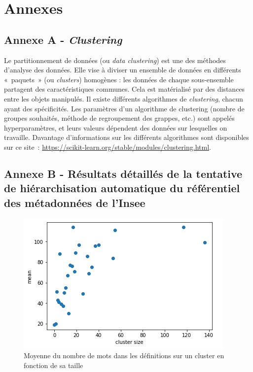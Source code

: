 \section*{Annexes}

\subsection*{Annexe A - \textit{Clustering}}
Le partitionnement de données (ou \textit{data clustering}) est une des méthodes d'analyse des données. Elle vise à diviser un ensemble de données en différents «~paquets~» (ou \textit{clusters}) homogènes : les données de chaque sous-ensemble partagent des caractéristiques communes. Cela est matérialisé par des distances entre les objets manipulés. Il existe différents algorithmes de \textit{clustering}, chacun ayant des spécificités. Les paramètres d'un algorithme de clustering (nombre de groupes souhaités, méthode de regroupement des grappes, etc.) sont appelés hyperparamètres, et leurs valeurs dépendent des données sur lesquelles on travaille. Davantage d'informations sur les différents algorithmes sont disponibles sur ce site~: \href{https://scikit-learn.org/stable/modules/clustering.html}{https://scikit-learn.org/stable/modules/clustering.html}.
\label{clustering}
\newpage

\subsection*{Annexe B - Résultats détaillés de la tentative de hiérarchisation automatique du référentiel des métadonnées de l'Insee}

\begin{figure}[H]
    \centering
    \includegraphics{images/hierarchisation-plot.png}
    \caption{Moyenne du nombre de mots dans les définitions sur un cluster en fonction de sa taille}
    \label{fig:hierarchisation}
\end{figure}

